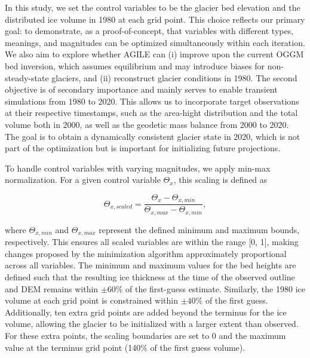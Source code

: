 \documentclass[journal abbreviation, manuscript]{copernicus}
\begin{document}
In this study, we set the control variables to be the glacier bed elevation and the distributed ice volume in 1980 at each grid point. This choice reflects our primary goal: to demonstrate, as a proof-of-concept, that variables with different types, meanings, and magnitudes can be optimized simultaneously within each iteration. We also aim to explore whether AGILE can (i) improve upon the current OGGM bed inversion, which assumes equilibrium and may introduce biases for non-steady-state glaciers, and (ii) reconstruct glacier conditions in 1980. The second objective is of secondary importance and mainly serves to enable transient simulations from 1980 to 2020. This allows us to incorporate target observations at their respective timestamps, such as the area-hight distribution and the total volume both in 2000, as well as the geodetic mass balance from 2000 to 2020. The goal is to obtain a dynamically consistent glacier state in 2020, which is not part of the optimization but is important for initializing future projections.

To handle control variables with varying magnitudes, we apply min-max normalization. For a given control variable $\Theta_x$, this scaling is defined as

\begin{equation}
    \Theta_{x,scaled} = \frac{\Theta_x - \Theta_{x,min}}{\Theta_{x,max} - \Theta_{x,min}},
\end{equation}

\noindent where $\Theta_{x,min}$ and $\Theta_{x,max}$ represent the defined minimum and maximum bounds, respectively. This ensures all scaled variables are within the range [0, 1], making changes proposed by the minimization algorithm approximately proportional across all variables. The minimum and maximum values for the bed heights are defined such that the resulting ice thickness at the time of the observed outline and DEM remains within $\pm 60\%$ of the first-guess estimate. Similarly, the 1980 ice volume at each grid point is constrained within $\pm 40\%$ of the first guess. Additionally, ten extra grid points are added beyond the terminus for the ice volume, allowing the glacier to be initialized with a larger extent than observed. For these extra points, the scaling boundaries are set to 0 and the maximum value at the terminus grid point (140\% of the first guess volume).
\end{document}
